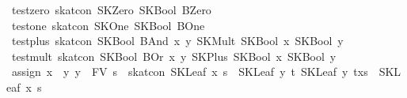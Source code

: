 \begin{isabellebody}
{}\ test{}zero{}\ {}skat{}con\ SKZero\ {}SKBool\ BZero{}{}\isanewline
{}\ test{}one{}\ {}skat{}con\ SKOne\ {}SKBool\ BOne{}{}\isanewline
{}\ test{}plus{}\ {}skat{}con\ {}SKBool\ {}BAnd\ x\ y{}{}\ {}SKMult\ {}SKBool\ x{}\ {}SKBool\ y{}{}{}\isanewline
{}\ test{}mult{}\ {}skat{}con\ {}SKBool\ {}BOr\ x\ y{}{}\ {}SKPlus\ {}SKBool\ x{}\ {}SKBool\ y{}{}{}\isanewline
\isanewline
{}\ assign{}{}\ {}{}x\ {}\ y{}\ y\ {}\ FV\ s{}\ {}\ skat{}con\ {}SKLeaf\ x\ s\ {}{}{}\ SKLeaf\ y\ t{}\ {}SKLeaf\ y\ {}t{}x{}s{}{}\ {}{}{}\ SKLeaf\ x\ s{}{}\isanewline

\end{isabellebody}
